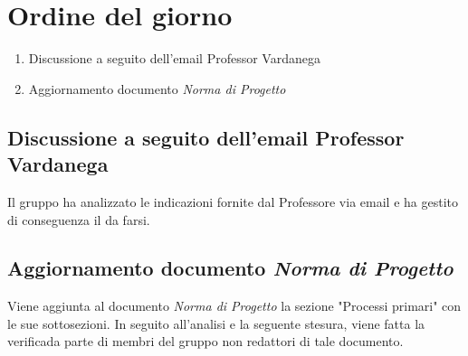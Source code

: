 \section{Ordine del giorno}
\begin{enumerate}
\item Discussione a seguito dell'email Professor Vardanega
\item Aggiornamento documento \textit{Norma di Progetto}
\end{enumerate}

\subsection{Discussione a seguito dell'email Professor Vardanega}
Il gruppo ha analizzato le indicazioni fornite dal Professore via email e ha gestito di conseguenza il da farsi. 
\subsection{Aggiornamento documento \textit{Norma di Progetto}}
Viene aggiunta al documento \textit{Norma di Progetto} la sezione "Processi primari" con le sue sottosezioni. In seguito all'analisi e la seguente stesura, viene fatta la verifica\glo da parte di membri del gruppo non redattori di tale documento. 